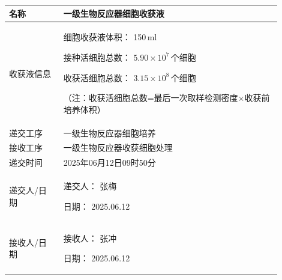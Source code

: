 \documentclass[UTF8,10pt,a4paper,fontset=fandol]{ctexart}
\newcommand{\fieldvalue}[1]{#1}
\newcommand{\handwritten}[1]{#1}
\begin{document}
\vspace{0.5em}

\begin{tabular}{|p{0.18\linewidth}|p{0.72\linewidth}|}
\hline
名称 &
\fieldvalue{一级生物反应器细胞收获液}
\\
\hline
\multirow{1}{*}{收获液信息} &
细胞收获液体积：
\fieldvalue{\handwritten{150}}\,ml

\par 接种活细胞总数：
\fieldvalue{\handwritten{$5.90\times10^{7}$}}\,个细胞

\par 收获活细胞总数：
\fieldvalue{\handwritten{$3.15\times10^{8}$}}\,个细胞

\par （注：收获活细胞总数=最后一次取样检测密度$\times$收获前培养体积）
\\
\hline
递交工序 &
\fieldvalue{一级生物反应器细胞培养}
\\
\hline
接收工序 &
\fieldvalue{一级生物反应器收获细胞处理}
\\
\hline
递交时间 &
\fieldvalue{\handwritten{2025年06月12日09时50分}}
\\
\hline
递交人/日期 &
递交人：
\fieldvalue{\handwritten{张梅}}

\par 日期：
\fieldvalue{\handwritten{2025.06.12}}
\\
\hline
接收人/日期 &
接收人：
\fieldvalue{\handwritten{张冲}}

\par 日期：
\fieldvalue{\handwritten{2025.06.12}}
\\
\hline
\end{tabular}
\end{document}
